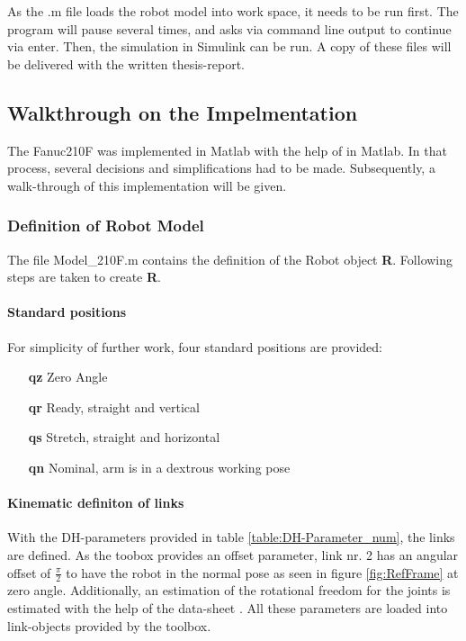 As the .m file loads the robot model into work space, it needs to be run first. The program will pause several times, and asks via command line output to continue via enter.  Then, the simulation in Simulink can be run.
A copy of these files will be delivered with the written thesis-report.

\subsection{Walkthrough on the Impelmentation}
The Fanuc210F was implemented in Matlab with the help of \cite{CorkeRoboticVisionControl} in Matlab. In that process, several decisions and simplifications had to be made. Subsequently, a walk-through of this implementation will be given.

\subsubsection{Definition of Robot Model}
The file Model_210F.m contains the definition of the Robot object \textbf{R}. Following steps are taken to create \textbf{R}.

\paragraph{Standard positions}
For simplicity of further work, four standard positions are provided:\\
\begin{itemize}
	\item[\textbf{qz}] Zero Angle
	\item[\textbf{qr}] Ready, straight and vertical
	\item[\textbf{qs}] Stretch, straight and horizontal
	\item[\textbf{qn}] Nominal, arm is in a dextrous working pose
\end{itemize}

\paragraph{Kinematic definiton of links}
With the DH-parameters provided in table \ref{table:DH-Parameter_num}, the links are defined. 
As the toobox provides an offset parameter, link nr. 2 has an angular offset of $\frac{\pi}{2}$ to have the robot in the normal pose as seen in figure \ref{fig:RefFrame} at zero angle.
Additionally, an estimation of the rotational freedom for the joints is estimated with the help of the data-sheet \cite{210FDatasheet}. All these parameters are loaded into link-objects provided by the toolbox.

